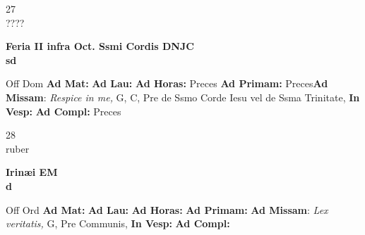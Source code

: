 \documentclass[10pt, openany]{book}
\begin{document}
    \begin{center}
        \begin{minipage}{3.5in}
            \vspace{2em}
            \begin{minipage}{0.5in}
                {\Huge 27} \\
                {\normalsize ????}
            \end{minipage}
            \begin{minipage}{3.0in}
                \textbf{ \large Feria II infra Oct. Ssmi Cordis DNJC \\
                \textnormal{\normalsize sd}}

            \end{minipage}
            \begin{justify}Off Dom
                \textbf{Ad Mat: }
                \textbf{Ad Lau: }
                \textbf{Ad Horas: }Preces
                \textbf{Ad Primam: }Preces\textbf{Ad Missam}: \textit{Respice in me,} G, C, Pre de Ssmo Corde Iesu vel de Ssma Trinitate, 
                \textbf{In Vesp: }
                \textbf{Ad Compl: }Preces
            \end{justify}
        \end{minipage}
    \end{center}

    \begin{center}
        \begin{minipage}{3.5in}
            \vspace{2em}
            \begin{minipage}{0.5in}
                {\Huge 28} \\
                {\normalsize ruber}
            \end{minipage}
            \begin{minipage}{3.0in}
                \textbf{ \large Irinæi EM \\
                \textnormal{\normalsize d}}

            \end{minipage}
            \begin{justify}Off Ord
                \textbf{Ad Mat: }
                \textbf{Ad Lau: }
                \textbf{Ad Horas: }
                \textbf{Ad Primam: }\textbf{Ad Missam}: \textit{Lex veritatis,} G, Pre Communis, 
                \textbf{In Vesp: }
                \textbf{Ad Compl: }
            \end{justify}
        \end{minipage}
    \end{center}
\end{document}
